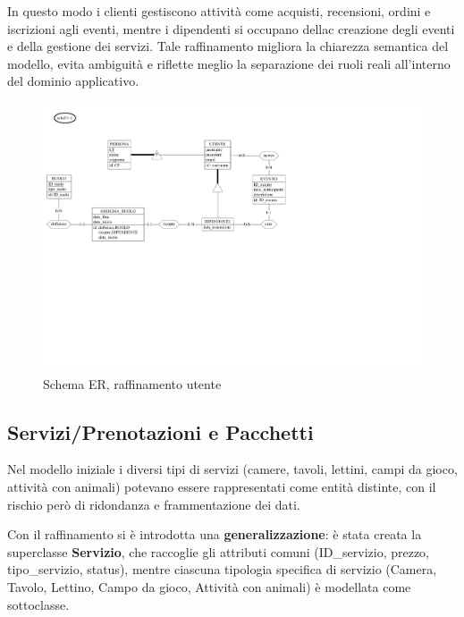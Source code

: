\documentclass[a4paper,12pt]{report}
\begin{document}
\vspace{\baselineskip}
In questo modo i clienti gestiscono attività come acquisti, recensioni, ordini e iscrizioni agli eventi, mentre
i dipendenti si occupano dellac creazione degli eventi e della gestione dei servizi. Tale raffinamento migliora
la chiarezza semantica del modello, evita ambiguità e riflette meglio la separazione dei ruoli reali all'interno
del dominio applicativo.

\begin{figure}[H]
	\centering
	\includegraphics[width=\textwidth, trim=0 250pt 300pt 0, clip]{./pdf/raffinamento utente.pdf}
	\caption{Schema ER, raffinamento utente}
	\label{fig:raffinamento-utente}
\end{figure}

\newpage
\subsection{Servizi/Prenotazioni e Pacchetti}
Nel modello iniziale i diversi tipi di servizi (camere, tavoli, lettini, campi da gioco, attività con animali) potevano essere
rappresentati come entità distinte, con il rischio però di ridondanza e frammentazione dei dati.

\vspace{\baselineskip}
Con il raffinamento si è introdotta una \textbf{generalizzazione}: è stata creata la superclasse \textbf{Servizio}, che raccoglie gli attributi comuni (ID\_servizio,
prezzo, tipo\_servizio, status), mentre ciascuna tipologia specifica di servizio (Camera, Tavolo, Lettino, Campo da gioco,
Attività con animali) è modellata come sottoclasse.
\end{document}
